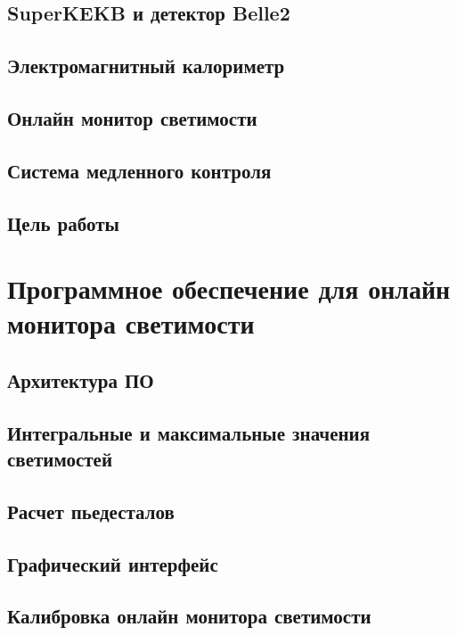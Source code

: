 \documentclass[a4paper, 12pt]{article}
\begin{document}
    \subsection{SuperKEKB и детектор Belle2}
    
    \subsection{Электромагнитный калориметр}
    
    \subsection{Онлайн монитор светимости}
    
    \subsection{Система медленного контроля}
    
    \subsection{Цель работы}
    

\section{Программное обеспечение для онлайн монитора светимости}
    \subsection{Архитектура ПО}
    
    \subsection{Интегральные и максимальные значения светимостей}
    
    \subsection{Расчет пьедесталов}
    
    \subsection{Графический интерфейс}
    
    \subsection{Калибровка онлайн монитора светимости}
    
\end{document}
